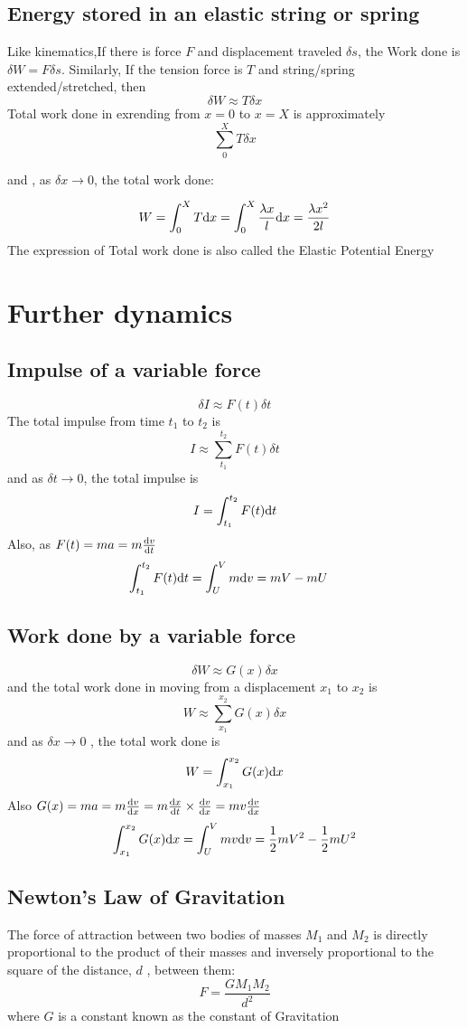 \documentclass[a4paper]{article}
\begin{document}
\subsection{Energy stored in an elastic string or spring}
Like kinematics,If there is force $F$ and displacement traveled $\delta s$, the Work done is $\delta W=F\delta s$. Similarly, If the tension force is $T$ and string/spring extended/stretched, then
\[
	\delta W \approx T \delta x
\]
Total work done in exrending from $x=0$ to $x=X$ is approximately
\[
	\sum^{X}_0 T \delta x
\]

and , as $\delta x \rightarrow 0 $, the total work done:

\[
	W=\int^X_0 T \mathrm{d} x= \int^X_0 \frac{\lambda x}{l}\mathrm{d} x=\frac{\lambda x^2}{2l}
\]
The expression of Total work done is also called the Elastic Potential Energy

\section{Further dynamics}
\subsection{Impulse of a variable force}
\[
	\delta I \approx F(t) \delta t
\]
The total impulse from time $t_1$ to $t_2$ is
\[
	I \approx \sum_{t_1}^{t_2} F(t) \delta t
\]
and as $\delta t \rightarrow 0$, the total impulse is
\[
	I=\int^{t_2}_{t_1} F(t) \mathrm{d} t
\]
Also, as $F(t)=ma=m\frac{\mathrm{d} v}{\mathrm{d} t}$
\begin{align*}
	\int_{t_1}^{t_2} F(t) \mathrm{d} t & =\int^{V}_{U} m \mathrm{d} v =mV-mU
\end{align*}
\subsection{Work done by a variable force}
\[
	\delta W \approx G(x)\delta x
\]
and the total work done in moving from a displacement $x_1$ to $x_2$ is
\[
	W\approx\sum_{x_1}^{x_2} G(x)\delta x
\]
and as $\delta x \rightarrow 0$ , the total work done is
\[
	W=\int_{x_1}^{x_2} G(x) \mathrm{d} x
\]
Also $G(x)=ma=m\frac{\mathrm{d} v}{\mathrm{d} x}=m\frac{\mathrm{d} x}{\mathrm{d} t}\times \frac{\mathrm{d} v}{\mathrm{d} x}=mv\frac{\mathrm{d} v}{\mathrm{d} x}$
\[
	\int_{x_1}^{x_2} G(x) \mathrm{d} x =\int_U^V mv \mathrm{d} v =\frac{1}{2}mV^2-\frac{1}{2}mU^2
\]

\subsection{Newton's Law of Gravitation}
\begin{law}
	The force of attraction between two bodies of masses
	$M_1$
	and
	$M_2$
	is directly proportional to the product of their masses and inversely proportional to the square of the distance,
	$d$ , between them:
	\[
		F=\frac{GM_1M_2}{d^2}
	\]
	where $G$ is a constant known as the constant of Gravitation
\end{law}
\end{document}
